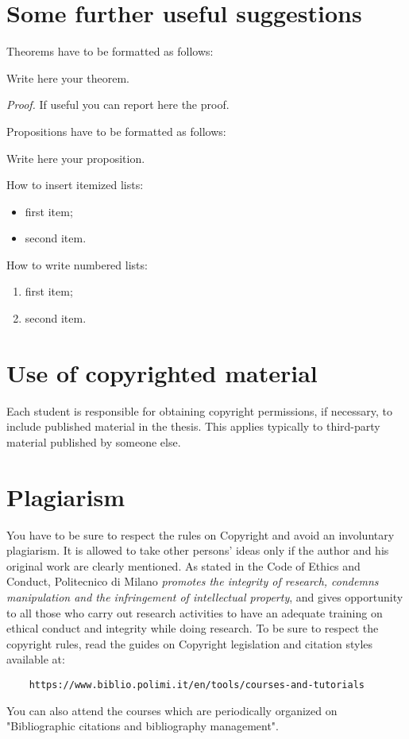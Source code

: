 \section{Some further useful suggestions}

Theorems have to be formatted as follows:
\begin{theorem}
	\label{a_theorem}
	Write here your theorem. 
\end{theorem}
\textit{Proof.} If useful you can report here the proof.
\vspace{0.3cm} %

Propositions have to be formatted as follows:
\begin{proposition}
	Write here your proposition.
\end{proposition}
\vspace{0.3cm} %

How to insert itemized lists:
\begin{itemize}
	\item first item;
	\item second item.
\end{itemize}
How to write numbered lists:
\begin{enumerate}
	\item first item;
	\item second item.
\end{enumerate}

\section{Use of copyrighted material}

Each student is responsible for obtaining copyright permissions, if necessary, to include published material in the thesis.
This applies typically to third-party material published by someone else.

\section{Plagiarism}

You have to be sure to respect the rules on Copyright and avoid an involuntary plagiarism.
It is allowed to take other persons' ideas only if the author and his original work are clearly mentioned.
As stated in the Code of Ethics and Conduct, Politecnico di Milano \textit{promotes the integrity of research,
	condemns manipulation and the infringement of intellectual property}, and gives opportunity to all those
who carry out research activities to have an adequate training on ethical conduct and integrity while doing research.
To be sure to respect the copyright rules, read the guides on Copyright legislation and citation styles available
at:
\begin{verbatim}
	https://www.biblio.polimi.it/en/tools/courses-and-tutorials
\end{verbatim}
You can also attend the courses which are periodically organized on "Bibliographic citations and bibliography management".

